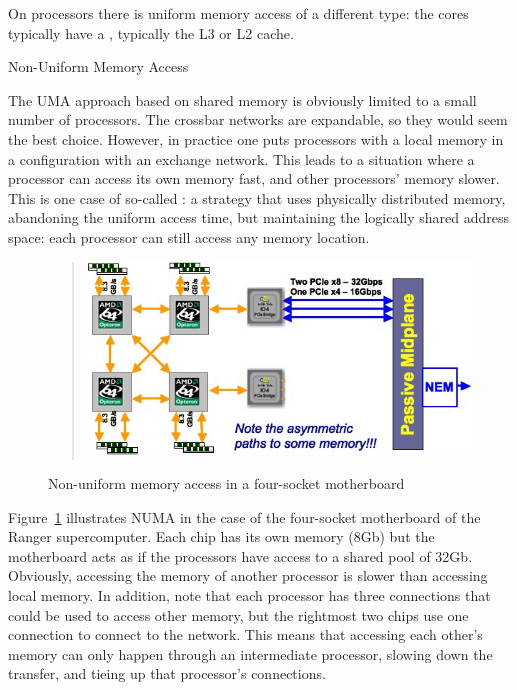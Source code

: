 On  processors there is uniform memory access of
a different type: the cores typically have a
, typically the L3 or L2 cache.

 {Non-Uniform Memory Access}

The \ac{UMA} approach based on shared memory 
is obviously limited to a small number of
processors. The crossbar networks are expandable, so they would seem 
the best choice. 
However, in practice one puts 
processors with a local memory in a configuration with an exchange
network. This leads to a situation where a processor can access its
own memory fast, and other processors' memory slower.
This is one case of so-called : a strategy that
uses physically distributed memory, abandoning the uniform access
time, but maintaining the logically shared address space: each processor can
still access any memory location.

\begin{figure}
  \begin{quote}
  \includegraphics[scale=.6]{graphics-public/ranger-numa}
  \end{quote}
  \caption{Non-uniform memory access in a four-socket motherboard}
  \label{fig:ranger-numa}
\end{figure}

Figure~\ref{fig:ranger-numa} illustrates \ac{NUMA} in the case of the
four-socket motherboard of the Ranger supercomputer. Each chip has its
own memory (8Gb) but the motherboard acts as if the processors have
access to a shared pool of 32Gb. Obviously, accessing the memory of
another processor is slower than accessing local memory. In addition,
note that each processor has three connections that could be used to
access other memory, but the rightmost two chips use one connection to
connect to the network. This means that accessing each other's memory
can only happen through an intermediate processor, slowing down the
transfer, and tieing up that processor's connections.

